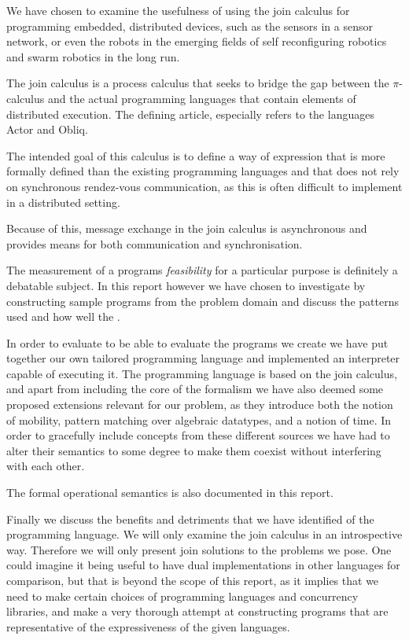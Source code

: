 
We have chosen to examine the usefulness of using the join calculus for
programming embedded, distributed devices, such as the sensors in a sensor
network, or even the robots in the emerging fields of self reconfiguring
robotics and swarm robotics in the long run.

The join calculus is a process calculus that seeks to bridge the gap between the
$\pi$-calculus and the actual programming languages that contain elements of
distributed execution. The defining article, \cite{fournet1996reflexive}
especially refers to the languages Actor and Obliq.

The intended goal of this calculus is to define a way of expression that is more
formally defined than the existing programming languages and that does not rely
on synchronous rendez-vous communication, as this is often difficult to
implement in a distributed setting.

Because of this, message exchange in the join calculus is asynchronous and
provides means for both communication and synchronisation.

The measurement of a programs \emph{feasibility} for a particular purpose is
definitely a debatable subject. In this report however we have chosen to
investigate by constructing sample programs from the problem domain and discuss
the patterns used and how well the .

In order to evaluate to be able to evaluate the programs we create we have put
together our own tailored programming language and implemented an interpreter
capable of executing it. The programming language is based on the join calculus,
and apart from including the core of the formalism we have also deemed some
proposed extensions relevant for our problem, as they introduce both the notion
of mobility, pattern matching over algebraic datatypes, and a notion of time.
In order to gracefully include concepts from these different sources we have had
to alter their semantics to some degree to make them coexist without interfering
with each other.

The formal operational semantics  is also documented in this report.

Finally we discuss  the benefits and detriments that we have identified of the
programming language. We will only examine the join calculus in an introspective
way. Therefore we will only present join solutions to the problems we pose. One
could imagine it being useful to have dual implementations in other languages
for comparison, but that is beyond the scope of this report, as it implies that
we need to make certain choices of programming languages and concurrency
libraries, and make a very thorough attempt at constructing programs that are
representative of the expressiveness of the given languages.
